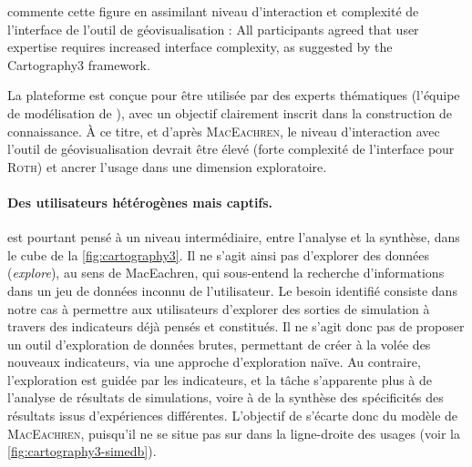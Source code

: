 \textcite[16]{roth_interactivity_2015} commente cette figure en assimilant niveau d'interaction et complexité de l'interface de l'outil de géovisualisation : \og All participants agreed that user expertise requires increased interface complexity, as suggested by the Cartography3 framework\fg{}.

La plateforme \simedb{} est conçue pour être utilisée par des experts thématiques (l'équipe de modélisation de \simfeodal{}), avec un objectif clairement inscrit dans la construction de connaissance.
À ce titre, et d'après \textsc{MacEachren}, le niveau d'interaction avec l'outil de géovisualisation devrait être élevé (forte complexité de l'interface pour \textsc{Roth}) et ancrer l'usage dans une dimension exploratoire.



\paragraph{Des utilisateurs hétérogènes mais captifs.}

\simedb{} est pourtant pensé à un niveau intermédiaire, entre l'analyse et la synthèse, dans le cube de la \cref{fig:cartography3}.
Il ne s'agit ainsi pas d'explorer des données (\textit{explore}), au sens de MacEachren, qui sous-entend la recherche d'informations dans un jeu de données inconnu de l'utilisateur.
Le besoin identifié consiste dans notre cas à permettre aux utilisateurs d'explorer des sorties de simulation à travers des indicateurs déjà pensés et constitués.
Il ne s'agit donc pas de proposer un outil d'exploration de données brutes, permettant de créer à la volée des nouveaux indicateurs, via une approche d'exploration naïve.
Au contraire, l'exploration est guidée par les indicateurs, et la tâche s'apparente plus à de l'analyse de résultats de simulations, voire à de la synthèse des spécificités des résultats issus d'expériences différentes.
L'objectif de \simedb{} s'écarte donc du modèle de \textsc{MacEachren}, puisqu'il ne se situe pas sur dans la ligne-droite des usages (voir la \cref{fig:cartography3-simedb}).

